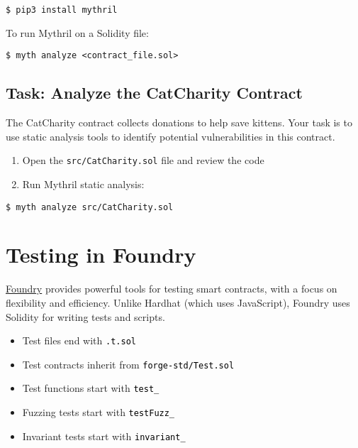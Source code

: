 \documentclass[12pt]{article}
\newcommand{\codegrey}[1]{%
  \texttt{\colorbox{black!4}{\textcolor{black}{#1}}}%
}
\begin{document}
\noindent
\noindent \begin{minipage}{\textwidth}
\begin{verbatim}
$ pip3 install mythril
\end{verbatim}
\end{minipage}

\medskip
\noindent
To run Mythril on a Solidity file:

\noindent \begin{minipage}{\textwidth}
\begin{verbatim}
$ myth analyze <contract_file.sol>
\end{verbatim}
\end{minipage}

\subsection*{Task: Analyze the CatCharity Contract}

The CatCharity contract collects donations to help save kittens. Your task is to use static analysis tools to identify potential vulnerabilities in this contract.

\begin{enumerate}
    \item Open the \texttt{src/CatCharity.sol} file and review the code
    \item Run Mythril static analysis:
\end{enumerate}

\begin{verbatim}
$ myth analyze src/CatCharity.sol
\end{verbatim}

\section{Testing in Foundry}

\href{https://github.com/foundry-rs/foundry}{Foundry} provides powerful tools for testing smart contracts, with a focus on flexibility and efficiency. Unlike Hardhat (which uses JavaScript), Foundry uses Solidity for writing tests and scripts.

\begin{itemize}
    \item Test files end with \codegrey{.t.sol}
    \item Test contracts inherit from \codegrey{forge-std/Test.sol}
    \item Test functions start with \codegrey{test\_}
    \item Fuzzing tests start with \codegrey{testFuzz\_}
    \item Invariant tests start with \codegrey{invariant\_}
\end{itemize}
\end{document}
